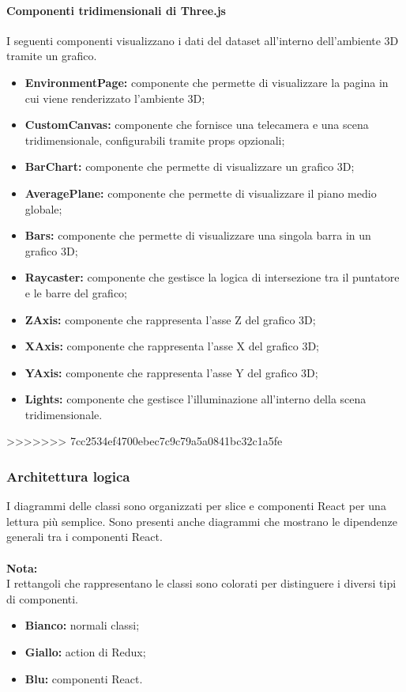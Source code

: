 \paragraph{Componenti tridimensionali di Three.js}
I seguenti componenti visualizzano i dati del dataset all'interno dell'ambiente
3D tramite un grafico.
\begin{itemize}
    \item \textbf{EnvironmentPage:} componente che permette di visualizzare la pagina in cui viene renderizzato l'ambiente 3D;
    \item \textbf{CustomCanvas:} componente che fornisce una telecamera e una scena tridimensionale, configurabili tramite props opzionali;
    \item \textbf{BarChart:} componente che permette di visualizzare un grafico 3D;
    \item \textbf{AveragePlane:} componente che permette di visualizzare il piano medio globale;
    \item \textbf{Bars:} componente che permette di visualizzare una singola barra in un grafico 3D;
    \item \textbf{Raycaster:} componente che gestisce la logica di intersezione tra il puntatore e le barre del grafico;
    \item \textbf{ZAxis:} componente che rappresenta l'asse Z del grafico 3D;
    \item \textbf{XAxis:} componente che rappresenta l'asse X del grafico 3D;
    \item \textbf{YAxis:} componente che rappresenta l'asse Y del grafico 3D;
    \item \textbf{Lights:} componente che gestisce l'illuminazione all'interno della scena tridimensionale.
\end{itemize}
>>>>>>> 7cc2534ef4700ebec7c9c79a5a0841bc32c1a5fe

\pagebreak

\subsubsection{Architettura logica}
I diagrammi delle classi sono organizzati per slice e componenti React per una
lettura più semplice. Sono presenti anche diagrammi che mostrano le dipendenze
generali tra i componenti React.\\\\ \textbf{Nota:}\\ I rettangoli che
rappresentano le classi sono colorati per distinguere i diversi tipi di
componenti.
\begin{itemize}
    \item \textbf{Bianco:} normali classi;
    \item \textbf{Giallo:} action di Redux;
    \item \textbf{Blu:} componenti React.
\end{itemize}

